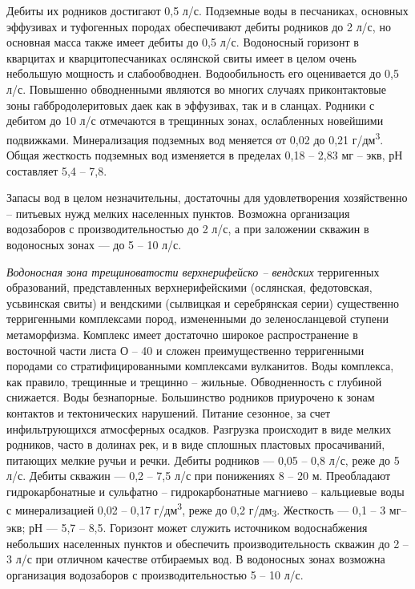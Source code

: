 Дебиты их родников достигают 0,5 л/с. Подземные воды в песчаниках, основных эффузивах и туфогенных породах обеспечивают дебиты родников до
2 л/с, но основная масса также имеет дебиты до 0,5 л/с. Водоносный горизонт в кварцитах и кварцитопесчаниках ослянской свиты имеет в целом очень небольшую мощность и слабообводнен. Водообильность его оценивается до 0,5 л/с. Повышенно обводненными являются во многих случаях приконтактовые зоны габбродолеритовых даек как в эффузивах, так и в сланцах. Родники с дебитом до 10 л/с отмечаются в трещинных зонах, ослабленных новейшими подвижками. Минерализация подземных вод меняется от 0,02 до 0,21 г/дм\textsuperscript{3}. Общая жесткость подземных вод изменяется в пределах 0,18 -- 2,83 мг -- экв, рН составляет 5,4 -- 7,8.

Запасы вод в целом незначительны, достаточны для удовлетворения хозяйственно -- питьевых нужд мелких населенных пунктов. Возможна организация водозаборов с производительностью до 2 л/с, а при заложении скважин в водоносных зонах  ---  до 5 -- 10 л/с.

\textit{Водоносная зона трещиноватости верхнерифейско -- вендских} терригенных образований, представленных верхнерифейскими (ослянская, федотовская, усьвинская свиты) и вендскими (сылвицкая и серебрянская серии) существенно терригенными комплексами пород, измененными до
зеленосланцевой ступени метаморфизма. Комплекс имеет достаточно широкое распространение в восточной части листа О -- 40 и сложен преимущественно терригенными породами со стратифицированными комплексами вулканитов. Воды комплекса, как правило, трещинные и трещинно -- жильные.
Обводненность с глубиной снижается. Воды безнапорные. Большинство родников приурочено к зонам контактов и тектонических нарушений. Питание сезонное, за счет инфильтрующихся атмосферных осадков. Разгрузка происходит в виде мелких родников, часто в долинах рек, и в виде сплошных
пластовых просачиваний, питающих мелкие ручьи и речки. Дебиты родников ---  0,05 -- 0,8 л/с, реже до 5 л/с. Дебиты скважин  ---  0,2 -- 7,5 л/с при понижениях 8 -- 20 м. Преобладают гидрокарбонатные и сульфатно -- гидрокарбонатные магниево -- кальциевые воды с минерализацией 0,02 -- 0,17 г/дм\textsuperscript{3}, реже до 0,2 г/дм\textsubscript{3}. Жесткость  ---  0,1 -- 3 мг--экв; рН  ---  5,7 -- 8,5. Горизонт может служить источником водоснабжения небольших населенных пунктов и обеспечить производительность скважин до 2 -- 3 л/с при отличном качестве отбираемых
вод. В водоносных зонах возможна организация водозаборов с производительностью 5 -- 10 л/с.

